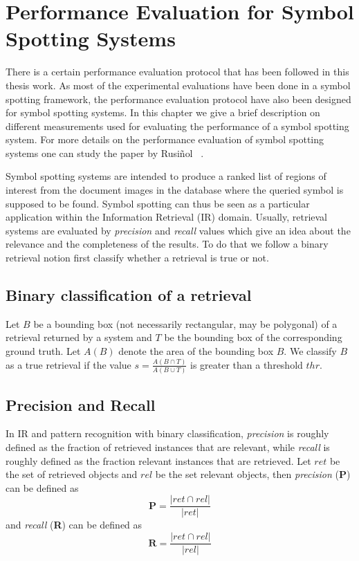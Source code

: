 \chapter{Performance Evaluation for Symbol Spotting Systems}
\label{app:perf-eval}
\graphicspath{{./chapters/Appendix/figs/}}
There is a certain performance evaluation protocol that has been followed in this thesis work. As most of the experimental evaluations have been done in a symbol spotting framework, the performance evaluation protocol have also been designed for symbol spotting systems. In this chapter we give a brief description on different measurements used for evaluating the performance of a symbol spotting system. For more details on the performance evaluation of symbol spotting systems one can study the paper by Rusi{\~n}ol \etal~\cite{Rusinol2009}.

Symbol spotting systems are intended to produce a ranked list of regions of interest from the document images in the database where the queried symbol is supposed to be found. Symbol spotting can thus be seen as a particular application within the Information Retrieval (IR) domain. Usually, retrieval systems are evaluated by \emph{precision} and \emph{recall} values which give an idea about the relevance and the completeness of the results. To do that we follow a binary retrieval notion \ie first classify whether a retrieval is true or not.

\section{Binary classification of a retrieval}
\label{sec:perf-eval:class-ret}
Let $B$ be a bounding box (not necessarily rectangular, may be polygonal) of a retrieval returned by a system and $T$ be the bounding box of the corresponding ground truth. Let $A(B)$ denote the area of the bounding box $B$. We classify $B$ as a true retrieval if the value $s=\frac{A(B\cap T)}{A(B\cup T)}$ is greater than a threshold $thr$.

\section{Precision and Recall}
\label{sec:perf-eval:prec-rec}
In IR and pattern recognition with binary classification, \emph{precision} is roughly defined as the fraction of retrieved instances that are relevant, while \emph{recall} is roughly defined as the fraction relevant instances that are retrieved. Let $ret$ be the set of retrieved objects and $rel$ be the set relevant objects, then \emph{precision} (\textbf{P}) can be defined as
\[
\textbf{P} = \frac{|ret\cap rel|} {|ret|}
\]
and \emph{recall} (\textbf{R}) can be defined as 
\[
\textbf{R} = \frac{|ret\cap rel|} {|rel|}
\]


